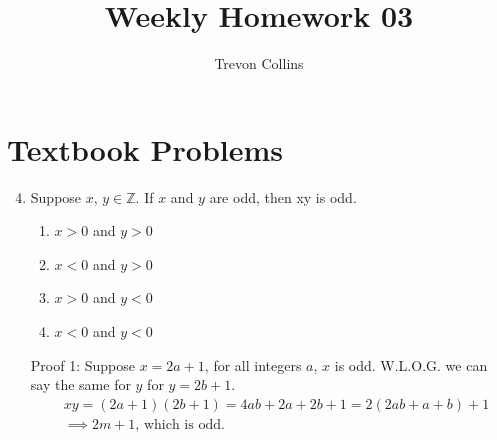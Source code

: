 \documentclass{article}
\title{Weekly Homework 03}
\author{Trevon Collins}
\date{}
\begin{document}
\maketitle
\section{Textbook Problems}
\begin{enumerate}[label=\#\arabic*]
    \setcounter{enumi}{3}
    \item Suppose $x$, $y \in \mathbb{Z}$. If $x$ and $y$ are odd, then xy is odd.
    \begin{enumerate}[label=Case \arabic*:]
        \item $x > 0$ and $y > 0$
        \item $x < 0$ and $y > 0$
        \item $x > 0$ and $y < 0$
        \item $x < 0$ and $y < 0$
    \end{enumerate}
    Proof 1: Suppose $x=2a+1$, for all integers $a$, $x$ is odd. 
    W.L.O.G. we can say the same for $y$ for $y=2b+1$.
    \[
        \begin{aligned}
            &xy = (2a+1)(2b+1) = 4ab + 2a + 2b + 1 = 2(2ab + a + b) + 1\\
            &\implies 2m + 1 \text{, which is odd.}
        \end{aligned}
    \]


\end{enumerate}
\end{document}
